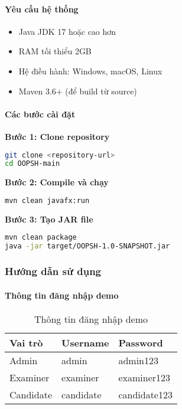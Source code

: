 \documentclass[12pt,a4paper]{article}
\begin{document}
\paragraph{Yêu cầu hệ thống}
\begin{itemize}
    \item Java JDK 17 hoặc cao hơn
    \item RAM tối thiểu 2GB
    \item Hệ điều hành: Windows, macOS, Linux
    \item Maven 3.6+ (để build từ source)
\end{itemize}

\paragraph{Các bước cài đặt}

\textbf{Bước 1: Clone repository}
\begin{lstlisting}[language=bash]
git clone <repository-url>
cd OOPSH-main
\end{lstlisting}

\textbf{Bước 2: Compile và chạy}
\begin{lstlisting}[language=bash]
mvn clean javafx:run
\end{lstlisting}

\textbf{Bước 3: Tạo JAR file}
\begin{lstlisting}[language=bash]
mvn clean package
java -jar target/OOPSH-1.0-SNAPSHOT.jar
\end{lstlisting}

\subsubsection{Hướng dẫn sử dụng}

\paragraph{Thông tin đăng nhập demo}

\begin{table}[H]
\centering
\caption{Thông tin đăng nhập demo}
\label{tab:login_info}
\begin{tabular}{|l|l|l|}
\hline
\textbf{Vai trò} & \textbf{Username} & \textbf{Password} \\
\hline
Admin & admin & admin123 \\
\hline
Examiner & examiner & examiner123 \\
\hline
Candidate & candidate & candidate123 \\
\hline
\end{tabular}
\end{table}
\end{document}
